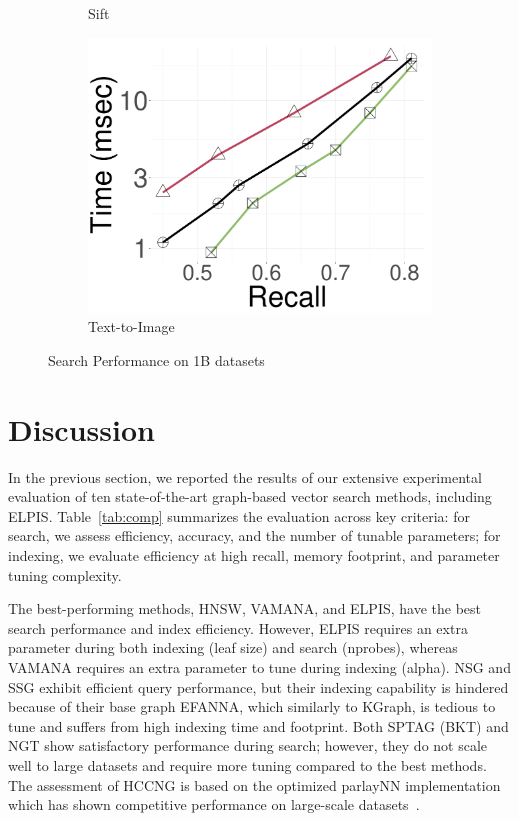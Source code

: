 \begin{figure}
\begin{subfigure}{\soneM\textwidth}
			\caption{Sift}  
			\label{fig:elpis:query:performance:1B:sift:10NN}
		\end{subfigure}
    \hspace{0.4cm}
  		\begin{subfigure}{\soneM\textwidth}
			\includegraphics[width=\textwidth]{../img/Experiments/search/1B/text2img_10nn.pdf}
			\caption{Text-to-Image}  
			\label{fig:elpis:query:performance:1B:t2i:10NN}
		\end{subfigure}
		\caption{{Search Performance on 1B datasets}}	
		\label{fig:elpis:query:performance:1B}
	\end{figure}

\section{Discussion}
\label{sec:discussion}
In the previous section, we reported the results of our extensive experimental evaluation
of ten state-of-the-art graph-based vector search methods, including ELPIS.
Table~\ref{tab:comp} summarizes the evaluation across key criteria: %
for search, we assess efficiency, accuracy, and the number of tunable parameters; 
for indexing, we evaluate efficiency at high recall, memory footprint, and parameter tuning complexity. 

The best-performing methods, HNSW, VAMANA, and ELPIS, have the best search performance and index efficiency. However, ELPIS requires an extra parameter during both indexing (leaf size) and search (nprobes), whereas VAMANA requires an extra parameter to tune during indexing (alpha). NSG and SSG exhibit efficient query performance, but their indexing capability is hindered because of their base graph EFANNA, which similarly to KGraph, is tedious to tune and suffers from high indexing time and footprint. Both SPTAG (BKT) and NGT show satisfactory performance during search; however, they do not scale well to large datasets and require more tuning compared to the best methods. The assessment of HCCNG is based on the optimized parlayNN implementation which has shown competitive performance on large-scale datasets~\cite{parlayann}.

